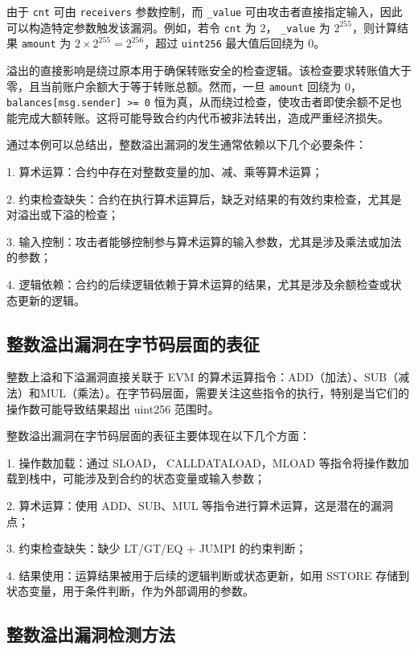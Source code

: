 \documentclass[print, master, vlined, timesmath]{DissertUESTC}
\begin{document}
由于 \texttt{cnt} 可由 \texttt{receivers} 参数控制，而 \texttt{\_value} 可由攻击者直接指定输入，因此可以构造特定参数触发该漏洞。例如，若令 \texttt{cnt} 为 $2$， \texttt{\_value} 为 $2^{255}$，则计算结果 \texttt{amount} 为 $2 \times 2^{255} = 2^{256}$，超过 \texttt{uint256} 最大值后回绕为 $0$。

溢出的直接影响是绕过原本用于确保转账安全的检查逻辑。该检查要求转账值大于零，且当前账户余额大于等于转账总额。然而，一旦 \texttt{amount} 回绕为 $0$，\texttt{balances[msg.sender] >= 0} 恒为真，从而绕过检查，使攻击者即使余额不足也能完成大额转账。这将可能导致合约内代币被非法转出，造成严重经济损失。

通过本例可以总结出，整数溢出漏洞的发生通常依赖以下几个必要条件：

1. 算术运算：合约中存在对整数变量的加、减、乘等算术运算；

2. 约束检查缺失：合约在执行算术运算后，缺乏对结果的有效约束检查，尤其是对溢出或下溢的检查；

3. 输入控制：攻击者能够控制参与算术运算的输入参数，尤其是涉及乘法或加法的参数；

4. 逻辑依赖：合约的后续逻辑依赖于算术运算的结果，尤其是涉及余额检查或状态更新的逻辑。 


\subsection{整数溢出漏洞在字节码层面的表征}
整数上溢和下溢漏洞直接关联于 EVM 的算术运算指令：ADD（加法）、SUB（减法）和MUL（乘法）。在字节码层面，需要关注这些指令的执行，特别是当它们的操作数可能导致结果超出 uint256 范围时。

整数溢出漏洞在字节码层面的表征主要体现在以下几个方面：

1. 操作数加载：通过 SLOAD， CALLDATALOAD，MLOAD 等指令将操作数加载到栈中，可能涉及到合约的状态变量或输入参数；

2. 算术运算：使用 ADD、SUB、MUL 等指令进行算术运算，这是潜在的漏洞点；

3. 约束检查缺失：缺少 LT/GT/EQ + JUMPI 的约束判断；

4. 结果使用：运算结果被用于后续的逻辑判断或状态更新，如用 SSTORE 存储到状态变量，用于条件判断，作为外部调用的参数。


\subsection{整数溢出漏洞检测方法}
\end{document}
